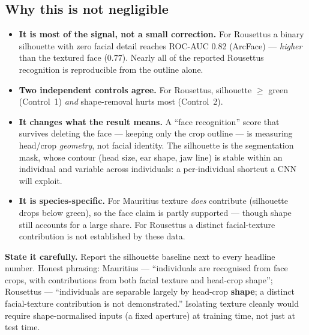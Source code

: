 \documentclass[11pt]{article}
\begin{document}
\subsection*{Why this is not negligible}
\begin{itemize}
\item \textbf{It is most of the signal, not a small correction.} For Rousettus a binary silhouette
with zero facial detail reaches ROC-AUC 0.82 (ArcFace) --- \emph{higher} than the textured face
(0.77). Nearly all of the reported Rousettus recognition is reproducible from the outline alone.
\item \textbf{Two independent controls agree.} For Rousettus, silhouette $\ge$ green (Control~1)
\emph{and} shape-removal hurts most (Control~2).
\item \textbf{It changes what the result means.} A ``face recognition'' score that survives deleting
the face --- keeping only the crop outline --- is measuring head/crop \emph{geometry}, not facial
identity. The silhouette is the segmentation mask, whose contour (head size, ear shape, jaw line) is
stable within an individual and variable across individuals: a per-individual shortcut a CNN will
exploit.
\item \textbf{It is species-specific.} For Mauritius texture \emph{does} contribute (silhouette drops
below green), so the face claim is partly supported --- though shape still accounts for a large share.
For Rousettus a distinct facial-texture contribution is not established by these data.
\end{itemize}
\begin{callout}[warn]
\textbf{State it carefully.} Report the silhouette baseline next to every headline number. Honest
phrasing: Mauritius --- ``individuals are recognised from face crops, with contributions from both
facial texture and head-crop shape''; Rousettus --- ``individuals are separable largely by head-crop
\textbf{shape}; a distinct facial-texture contribution is not demonstrated.'' Isolating texture
cleanly would require shape-normalised inputs (a fixed aperture) at training time, not just at test
time.
\end{callout}
\end{document}
